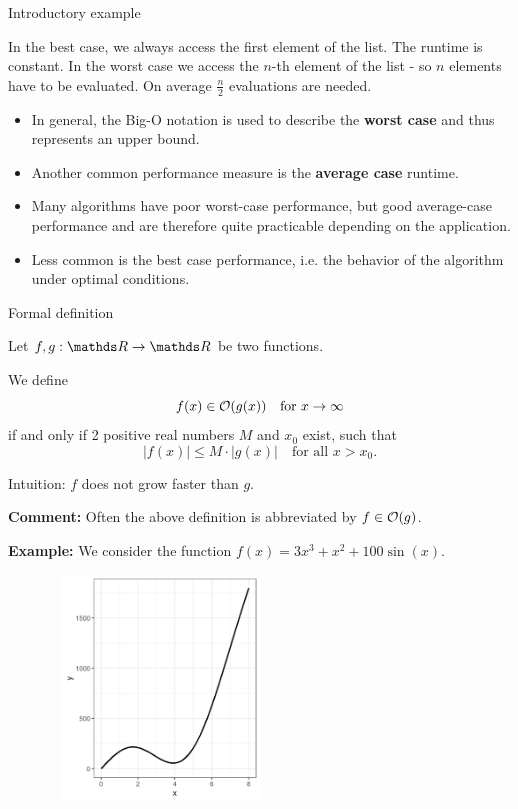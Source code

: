 \begin{vbframe}{Introductory example}
\begin{footnotesize}
In the best case, we always access the first element of the list. The runtime is constant. In the worst case we access the $n$-th element of the list - so $n$ elements have to be evaluated. On average $\frac{n}{2}$ evaluations are needed.
\end{footnotesize}


\framebreak

\begin{itemize}
  \item In general, the Big-O notation is used to describe the \textbf{worst case} and
  thus represents an upper bound.
  \item Another common performance measure is the \textbf{average case} runtime.
  \item Many algorithms have poor worst-case performance, but good average-case performance and are therefore quite practicable depending on the application.
  \item Less common is the best case performance, i.e. the behavior of the algorithm under optimal conditions.
\end{itemize}


\end{vbframe}

\begin{vbframe}{Formal definition}

Let $f, g: \R \to \R$ be two functions.

\lz

We define
$$
f(x) \in \mathcal{O}(g(x)) \quad \text{for } x \to \infty
$$
if and only if 2 positive real numbers $M$ and $x_0$ exist, such that
$$
|f(x)| \leq M \cdot |g(x)| \quad \text{for all } x > x_0.
$$

\lz

Intuition: $f$ does not grow faster than $g$.

\lz

\textbf{Comment:} Often the above definition is abbreviated by $f \in \mathcal{O}(g)$.

\framebreak

\textbf{Example:} We consider the function $f(x) = 3 x^3 + x^2 + 100 \sin(x)$.

\lz
\begin{center}
\begin{figure}
  \includegraphics[height = 6cm, width = 6cm]{figure_man/Example1.png}
\end{figure}
\end{center}

\end{vbframe}

